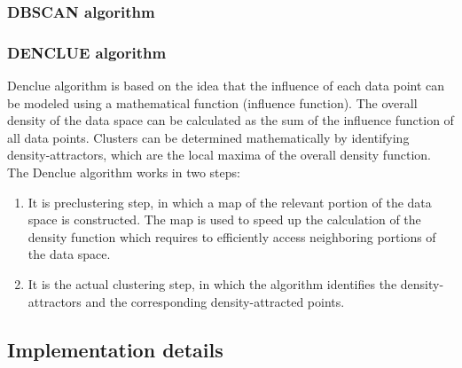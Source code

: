 \documentclass[12pt, a4paper, notitlepage, oneside]{article}
\begin{document}
\subsubsection*{DBSCAN algorithm}





\subsubsection*{DENCLUE algorithm}

Denclue algorithm is based on the idea that the influence of each data point can be modeled using a mathematical 
function (influence function). The overall density of the data space can be calculated as the sum of the influence 
function of all data points. Clusters can be determined mathematically by identifying density-attractors, 
which are the local maxima of the overall density function. The Denclue algorithm works in two steps:

\begin{enumerate}
	\item It is preclustering step, in which a map of the relevant portion of the data space is constructed. The map is used to speed up the calculation of the density function which requires to efficiently access neighboring portions of the data space. 
	\item It is the actual clustering step, in which the algorithm identifies the density-attractors and the corresponding density-attracted points.
\end{enumerate}

\subsection*{Implementation details}
\end{document}
